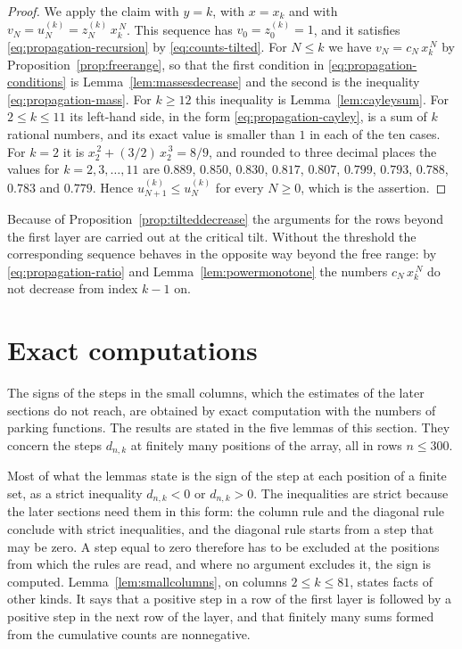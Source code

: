 \documentclass{amsart}
\theoremstyle{definition}
\theoremstyle{remark}
\numberwithin{equation}{section}
\begin{document}
\begin{proof}
We apply the claim with $y=k$, with $x=x_k$ and with
$v_N=u^{(k)}_N=z^{(k)}_N\,x_k^{\,N}$. This sequence has
$v_0=z^{(k)}_0=1$, and it satisfies \eqref{eq:propagation-recursion} by
\eqref{eq:counts-tilted}. For $N\le k$ we have $v_N=c_N\,x_k^{\,N}$ by
Proposition~\ref{prop:freerange}, so that the first condition in
\eqref{eq:propagation-conditions} is Lemma~\ref{lem:massesdecrease} and the
second is the inequality \eqref{eq:propagation-mass}. For $k\ge12$ this
inequality is Lemma~\ref{lem:cayleysum}. For $2\le k\le11$ its left-hand
side, in the form \eqref{eq:propagation-cayley}, is a sum of $k$ rational
numbers, and its exact value is smaller than $1$ in each of the ten cases.
For $k=2$ it is $x_2^{\,2}+(3/2)\,x_2^{\,3}=8/9$, and rounded to three
decimal places the values for $k=2,3,\dots,11$ are $0.889$, $0.850$,
$0.830$, $0.817$, $0.807$, $0.799$, $0.793$, $0.788$, $0.783$ and $0.779$.
Hence $u^{(k)}_{N+1}\le u^{(k)}_N$ for every $N\ge0$, which is the assertion.
\end{proof}

Because of Proposition~\ref{prop:tilteddecrease} the arguments for the rows
beyond the first layer are carried out at the critical tilt. Without the
threshold the
corresponding sequence behaves in the opposite way beyond the
free range: by \eqref{eq:propagation-ratio} and
Lemma~\ref{lem:powermonotone} the numbers $c_N\,x_k^{\,N}$ do not decrease
from index $k-1$ on.

\section{Exact computations}\label{sec:tables}
The signs of the steps in the small columns, which the estimates of the
later sections do not reach, are obtained by exact computation with the
numbers of parking functions. The results are stated in the five lemmas of
this section. They concern the steps $d_{n,k}$ at finitely many positions
of the array, all in rows $n\le300$.

Most of what the lemmas state is the sign of the step at each position of a
finite set, as a strict inequality $d_{n,k}<0$ or $d_{n,k}>0$. The
inequalities are strict because the later
sections need them in this form: the column rule and the diagonal rule
conclude with strict inequalities, and the diagonal rule starts from a step
that may be zero. A step equal to zero therefore has to be excluded at the
positions from which the rules are read, and where no argument excludes
it, the sign is computed. Lemma~\ref{lem:smallcolumns}, on columns
$2\le k\le81$, states facts of other kinds. It says that a positive step
in a row of the first layer is followed by a positive step in the next row
of the layer, and that finitely many sums formed from the cumulative
counts are nonnegative.
\end{document}
